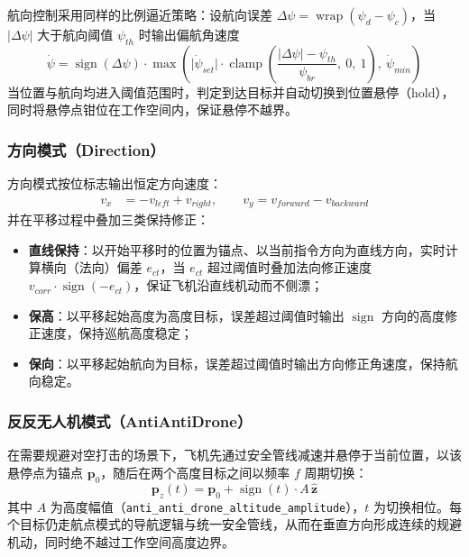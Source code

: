 航向控制采用同样的比例逼近策略：设航向误差 $\Delta\psi = \operatorname{wrap}(\psi_d - \psi_c)$，当 $\lvert \Delta\psi \rvert$ 大于航向阈值 $\psi_{th}$ 时输出偏航角速度
\begin{equation}
    \dot{\psi} = \operatorname{sign}(\Delta\psi)\cdot
    \max\left( \lvert \dot\psi_{set} \rvert
    \cdot \operatorname{clamp}\left( \frac{\lvert\Delta\psi\rvert - \psi_{th}}{\psi_{br}},\ 0,\ 1 \right),\ 
    \dot\psi_{min} \right)
\end{equation}
当位置与航向均进入阈值范围时，判定到达目标并自动切换到位置悬停（hold），同时将悬停点钳位在工作空间内，保证悬停不越界。

\subsubsection{方向模式（Direction）}
方向模式按位标志输出恒定方向速度：
\begin{equation}
\begin{aligned}
    v_x &= -v_{left} + v_{right}, \qquad v_y = v_{forward} - v_{backward}
\end{aligned}
\end{equation}
并在平移过程中叠加三类保持修正：
\begin{itemize}
    \item \textbf{直线保持}：以开始平移时的位置为锚点、以当前指令方向为直线方向，实时计算横向（法向）偏差 $e_{ct}$，当 $e_{ct}$ 超过阈值时叠加法向修正速度 $v_{corr}\cdot\operatorname{sign}(-e_{ct})$，保证飞机沿直线机动而不侧漂；
    \item \textbf{保高}：以平移起始高度为高度目标，误差超过阈值时输出 $\operatorname{sign}$ 方向的高度修正速度，保持巡航高度稳定；
    \item \textbf{保向}：以平移起始航向为目标，误差超过阈值时输出方向修正角速度，保持航向稳定。
\end{itemize}

\subsubsection{反反无人机模式（AntiAntiDrone）}
在需要规避对空打击的场景下，飞机先通过安全管线减速并悬停于当前位置，以该悬停点为锚点 $\boldsymbol{p}_0$，随后在两个高度目标之间以频率 $f$ 周期切换：
\begin{equation}
    \boldsymbol{p}_z(t) = \boldsymbol{p}_0 + \operatorname{sign}(t)\cdot A\,\hat{\boldsymbol{z}}
\end{equation}
其中 $A$ 为高度幅值（\lstinline{anti_anti_drone_altitude_amplitude}），$t$ 为切换相位。每个目标仍走航点模式的导航逻辑与统一安全管线，从而在垂直方向形成连续的规避机动，同时绝不越过工作空间高度边界。

